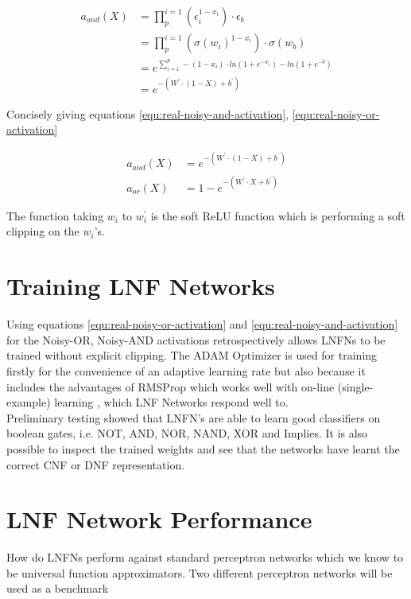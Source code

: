 \begin{align*}
a_{and}(X) &= \prod_{p}^{i=1} (\epsilon_i^{1 - x_i}) \cdot \epsilon_b\\
&= \prod_{p}^{i=1} (\sigma(w_i)^{1 - x_i}) \cdot \sigma(w_b)\\
&= e^{\sum^p_{i=1} -(1 - x_i) \cdot ln(1 + e^{-w_i}) - ln(1 + e^{-b})} \\
&= e^{-(W^{'} \cdot (1 - X) + b^{'})}
\end{align*}

Concisely giving equations \ref{equ:real-noisy-and-activation}, \ref{equ:real-noisy-or-activation}

\begin{align}
a_{and}(X) &= e^{-(W^{'} \cdot (1 - X) + b^{'})} \label{equ:real-noisy-and-activation}\\
a_{or}(X)&= 1 - e^{-(W^{'} \cdot X + b^{'})} \label{equ:real-noisy-or-activation}
\end{align}

The function taking $w_i$ to $w_i^{'}$ is the soft ReLU function which is performing a soft clipping on the $w_i$'s. 

\section{Training LNF Networks}
Using equations \ref{equ:real-noisy-or-activation} and \ref{equ:real-noisy-and-activation} for the Noisy-OR, Noisy-AND activations retrospectively allows LNFNs to be trained without explicit clipping. The ADAM Optimizer is used for training firstly for the convenience of an adaptive learning rate but also because it includes the advantages of RMSProp which works well with on-line (single-example) learning \cite{kingma2014adam}, which LNF Networks respond well to.\\

Preliminary testing showed that LNFN's are able to learn good classifiers on boolean gates, i.e. NOT, AND, NOR, NAND, XOR and Implies. It is also possible to inspect the trained weights and see that the networks have learnt the correct CNF or DNF representation.

\section{LNF Network Performance}
How do LNFNs perform against standard perceptron networks which we know to be universal function approximators. Two different perceptron networks will be used as a benchmark

